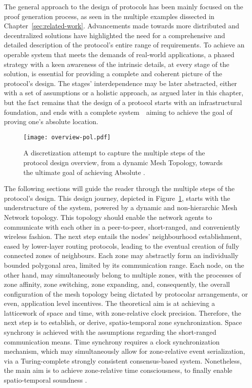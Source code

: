 The general approach to the design of \pol{} protocols has been mainly focused on the proof generation process, as seen in the multiple examples dissected in Chapter~\ref{sec:related-work}. Advancements made towards more distributed and decentralized solutions have highlighted the need for a comprehensive and detailed description of the protocol's entire range of requirements. To achieve an operable system that meets the demands of real-world applications, a phased strategy with a keen awareness of the intrinsic details, at every stage of the solution, is essential for providing a complete and coherent picture of the protocol's design. The stages' interdependence may be later abstracted, either with a set of assumptions or a holistic approach, as argued later in this chapter, but the fact remains that the design of a \pol{} protocol starts with an infrastructural foundation, and ends with a complete system~\textemdash~aiming to achieve the goal of proving one's absolute location.

\begin{figure}[ht]
    \begin{center}
    \texttt{[image: overview-pol.pdf]}
    \caption{A discretization attempt to capture the multiple steps of the protocol design overview, from a dynamic Mesh Topology, towards the ultimate goal of achieving Absolute \pol.}
    \label{fig:proof-of-location-overview}
    \end{center}
\end{figure}

The following sections will guide the reader through the multiple steps of the protocol's design. This design journey, depicted in Figure~\ref{fig:proof-of-location-overview}, starts with the understructure of the system, powered by a dynamic and non-hierarchic Mesh Network topology. This topology should enable the network agents to communicate with each other in a peer-to-peer, short-ranged, and conveniently wireless fashion. The next step entails the nodes' neighbourhood establishment, eased by lower-layer routing protocols, leading to the eventual creation of fully connected zones of neighbours. Each zone may abstractly form an individually bounded polygonal area, limited by its communication range. Each node, on the other hand, may simultaneously belong to multiple zones, with the processes of zone affinity, zone switching, zone expanding, and, consequently, the overall configuration of the mesh topology being dictated by protocolar arrangements, or even, application level incentives. The theoretical aim is at achieving a latticework of space and time, with zone-relative clock precision. Therefore, the next step is to establish, or derive, spatio-temporal zone synchronization. Space synchrony is achieved with the assumptions regarding the short-ranged communication means. Time synchrony requires a clock synchronization mechanism, which may simultaneously allow for zone-relative event serialization, via a Turing-complete strongly consistent consensus-based system. Nonetheless, the main aim is to achieve zone-relative time consciousness, to finally enable spatio-temporal soundness \cite{nasrulin2018robust}.

